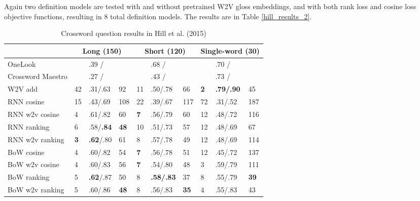 \documentclass[11pt]{article}
\begin{document}
\begin{spacing}{1}
Again two definition models are tested with and without pretrained W2V gloss embeddings, and with both rank loss and cosine loss objective functions, resulting in 8 total definition models. The results are in Table \ref{hill_results_2}.

\begin{table}[!htbp]
\caption{Crossword question results in Hill et al. (2015)}
\centering
\begin{tabular}{l|lll|lll|lll}
\toprule
                  & \multicolumn{3}{c|}{Long (150)}      & \multicolumn{3}{c|}{Short (120)}     & \multicolumn{3}{c}{Single-word (30)}        \\\midrule
OneLook           &    & .39 /            &             &    & .68 /            &             &            & .70 /            &             \\
Crossword Maestro &    & .27 /            &             &    & .43 /            &             &            & .73 /            &             \\\hline
W2V add           & 42 & .31/.63          & 92          & 11 & .50/.78          & 66          & \textbf{2} & \textbf{.79/.90} & 45          \\\hline
RNN cosine        & 15 & .43/.69          & 108         & 22 & .39/.67          & 117         & 72         & .31/.52          & 187         \\
RNN w2v cosine    & 4  & .61/.82          & 60          & \textbf{7}  & .56/.79          & 60          & 12         & .48/.72          & 116         \\
RNN ranking       & 6  & .58/\textbf{.84}         & \textbf{48} & 10 & .51/.73          & 57          & 12         & .48/.69          & 67          \\
RNN w2v ranking   & \textbf{3}  & \textbf{.62}/.80          & 61          & 8  & .57/.78          & 49          & 12         & .48/.69          & 114         \\
BoW cosine        & 4  & .60/.82          & 54          & \textbf{7}  & .56/.78          & 51          & 12         & .45/.72          & 137         \\
BoW w2v cosine    & 4  & .60/.83 & 56          & \textbf{7}  & .54/.80          & 48          & 3          & .59/.79          & 111         \\
BoW ranking       & 5  & \textbf{.62}/.87          & 50          & 8  & \textbf{.58/.83} & 37          & 8          & .55/.79          & \textbf{39} \\
BoW w2v ranking   & 5  & .60/.86          & \textbf{48} & 8  & .56/.83          & \textbf{35} & 4          & .55/.83          & 43         
\end{tabular}


\end{table}
\end{spacing}
\end{document}
